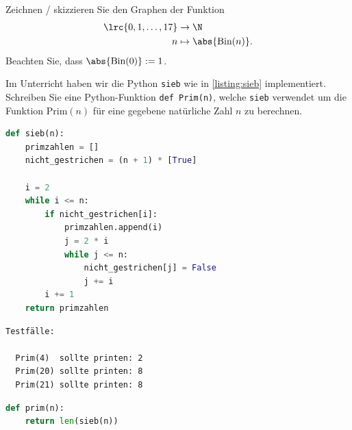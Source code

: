 \begin{questions}
	\question[2]
	Zeichnen / skizzieren Sie den Graphen der Funktion
	\begin{align*}
		\lrc{0, 1, \ldots, 17} & \to\N                       \\
		n                      & \mapsto\abs{\text{Bin}(n)}.
	\end{align*}
	Beachten Sie, dass $\abs{\text{Bin}(0)} := 1$.

	\begin{solution}
		\begin{figure}[H]
		\end{figure}
	\end{solution}


	\question[2] Im Unterricht haben wir die Python \lstinline|sieb| wie in \cref{listing:sieb} implementiert.
	Schreiben Sie eine Python-Funktion \lstinline|def Prim(n)|, welche \lstinline|sieb| verwendet um die Funktion $\text{Prim}(n)$ für eine gegebene natürliche Zahl $n$ zu berechnen.

	\begin{lstlisting}[language=Python,caption=Sieb des Eratosthenes,numbers=none,label=listing:sieb]
def sieb(n):
    primzahlen = []
    nicht_gestrichen = (n + 1) * [True]

    i = 2
    while i <= n:
        if nicht_gestrichen[i]:
            primzahlen.append(i)
            j = 2 * i
            while j <= n:
                nicht_gestrichen[j] = False
                j += i
        i += 1
    return primzahlen
\end{lstlisting}

	\begin{lstlisting}[numbers=none]
  Testfälle:

  Prim(4)  sollte printen: 2
  Prim(20) sollte printen: 8
  Prim(21) sollte printen: 8
\end{lstlisting}
	\begin{solution}
		\begin{lstlisting}[language=Python,caption=Prim,numbers=none]
def prim(n):
    return len(sieb(n))
\end{lstlisting}
	\end{solution}


\end{questions}
